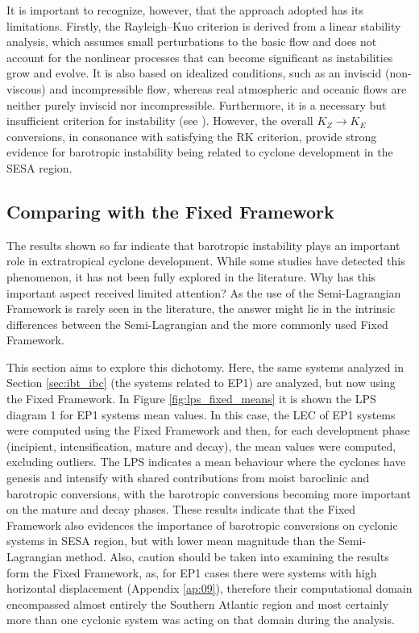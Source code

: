 It is important to recognize, however, that the approach adopted has its limitations. Firstly, the Rayleigh–Kuo criterion is derived from a linear stability analysis, which assumes small perturbations to the basic flow and does not account for the nonlinear processes that can become significant as instabilities grow and evolve. It is also based on idealized conditions, such as an inviscid (non-viscous) and incompressible flow, whereas real atmospheric and oceanic flows are neither purely inviscid nor incompressible. Furthermore, it is a necessary but insufficient criterion for instability (see \citet{read2020baroclinic}). However, the overall $K_Z \rightarrow K_E$ conversions, in consonance with satisfying the RK criterion, provide strong evidence for barotropic instability being related to cyclone development in the SESA region.

\subsection{Comparing with the Fixed Framework}

The results shown so far indicate that barotropic instability plays an important role in extratropical cyclone development. While some studies have detected this phenomenon, it has not been fully explored in the literature. Why has this important aspect received limited attention? As the use of the Semi-Lagrangian Framework is rarely seen in the literature, the answer might lie in the intrinsic differences between the Semi-Lagrangian and the more commonly used Fixed Framework.


This section aims to explore this dichotomy. Here, the same systems analyzed in Section \ref{sec:ibt_ibc} (the systems related to EP1) are analyzed, but now using the Fixed Framework. In Figure \ref{fig:lps_fixed_means} it is shown the LPS diagram 1 for EP1 systems mean values. In this case, the LEC of EP1 systems were computed using the Fixed Framework and then, for each development phase (incipient, intensification, mature and decay), the mean values were computed, excluding outliers. The LPS indicates a mean behaviour where the cyclones have genesis and intensify with shared contributions from moist baroclinic and barotropic conversions, with the barotropic conversions becoming more important on the mature and decay phases. These results indicate that the Fixed Framework also evidences the importance of barotropic conversions on cyclonic systems in SESA region, but with lower mean magnitude than the Semi-Lagrangian method. Also, caution should be taken into examining the results form the Fixed Framework, as, for EP1 cases there were systems with high horizontal displacement (Appendix \ref{ap:09}), therefore their computational domain encompassed almost entirely the Southern Atlantic region and most certainly more than one cyclonic system was acting on that domain during the analysis.

